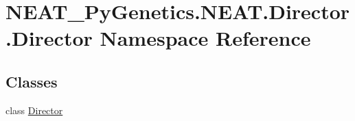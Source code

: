 \hypertarget{namespaceNEAT__PyGenetics_1_1NEAT_1_1Director_1_1Director}{}\section{N\+E\+A\+T\+\_\+\+Py\+Genetics.\+N\+E\+A\+T.\+Director.\+Director Namespace Reference}
\label{namespaceNEAT__PyGenetics_1_1NEAT_1_1Director_1_1Director}
\subsection*{Classes}
\begin{DoxyCompactItemize}
\item 
class \hyperlink{classNEAT__PyGenetics_1_1NEAT_1_1Director_1_1Director_1_1Director}{Director}
\end{DoxyCompactItemize}

